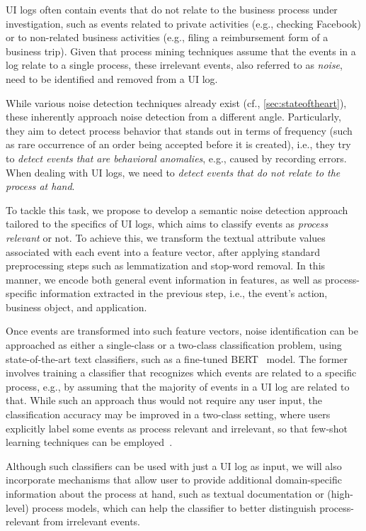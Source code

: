 UI logs often contain events that do not relate to the business process under investigation, such as events related to private activities (e.g., checking Facebook) or to non-related business activities (e.g., filing a reimbursement form of a business trip).
Given that process mining techniques assume that the events in a log relate to a single process, these irrelevant events, also referred to as \emph{noise}, need to be identified and removed from a UI log.

While various noise detection techniques already exist (cf., \autoref{sec:stateoftheart}), these  inherently approach noise detection from a different angle. Particularly, they aim to detect process behavior that stands out in terms of frequency (such as rare occurrence of an order being accepted before it is created), i.e., they try to \emph{detect events that are behavioral anomalies}, e.g., caused by recording errors.
When dealing with UI logs, we need to \emph{detect events that do not relate to the process at hand}. 

To tackle this task, we propose to develop a semantic noise detection approach tailored to the specifics of UI logs, which aims to classify events as \emph{process relevant} or not. 
To achieve this, we transform the textual attribute values associated with each event  into a feature vector, after applying standard preprocessing steps such as lemmatization and stop-word removal. In this manner, we encode both general event information in features, as well as process-specific information extracted in the previous step, i.e., the event's action, business object, and application.

Once events are transformed into such feature vectors, noise identification can be approached as either a single-class or a two-class classification problem, using state-of-the-art text classifiers, such as a fine-tuned BERT~\cite{Devlin2019} model. The former involves training a classifier that recognizes which events are related to a specific process, e.g., by assuming that the majority of events in a UI log are related to that. While such an approach thus would not require any user input, the classification accuracy may be improved in a two-class setting, where users explicitly label some events as process relevant and irrelevant, so that few-shot learning techniques can be employed~\cite{yu2018diverse}.

Although such classifiers can be used with just a UI log as input, we will also incorporate mechanisms that allow user to provide additional domain-specific information about the process at hand, such as textual documentation or (high-level) process models, which can help the classifier to better distinguish process-relevant from irrelevant events.

